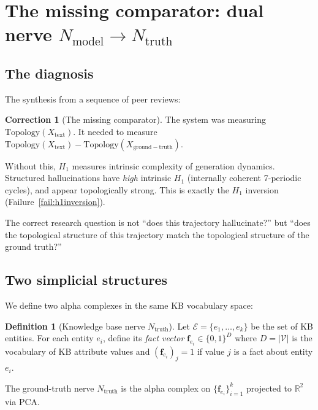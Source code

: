 \documentclass[11pt]{amsart}
\theoremstyle{definition}
\newtheorem{definition}[theorem]{Definition}
\newtheorem{correction}[theorem]{Correction}
\newcommand{\Nmod}{N_{\mathrm{model}}}
\newcommand{\Ntruth}{N_{\mathrm{truth}}}
\begin{document}
\section{The missing comparator: dual nerve $\Nmod \to \Ntruth$}
\label{sec:dual-nerve}

\subsection{The diagnosis}

The synthesis from a sequence of peer reviews:

\begin{correction}[The missing comparator]
The system was measuring $\mathrm{Topology}(X_\mathrm{text})$.
It needed to measure $\mathrm{Topology}(X_\mathrm{text}) - \mathrm{Topology}(X_\mathrm{ground-truth})$.

Without this, $H_1$ measures intrinsic complexity of generation dynamics.
Structured hallucinations have \emph{high} intrinsic $H_1$ (internally coherent
7-periodic cycles), and appear topologically strong.
This is exactly the $H_1$ inversion (Failure~\ref{fail:h1inversion}).

The correct research question is not ``does this trajectory hallucinate?''
but ``does the topological structure of this trajectory match the topological
structure of the ground truth?''
\end{correction}

\subsection{Two simplicial structures}

We define two alpha complexes in the same KB vocabulary space:

\begin{definition}[Knowledge base nerve $\Ntruth$]
Let $\mathcal{E} = \{e_1, \ldots, e_k\}$ be the set of KB entities.
For each entity $e_i$, define its \emph{fact vector} $\mathbf{f}_{e_i} \in \{0,1\}^D$
where $D = |\mathcal{V}|$ is the vocabulary of KB attribute values and
$(\mathbf{f}_{e_i})_j = 1$ if value $j$ is a fact about entity $e_i$.

The ground-truth nerve $\Ntruth$ is the alpha complex on
$\{\mathbf{f}_{e_i}\}_{i=1}^k$ projected to $\mathbb{R}^2$ via PCA.
\end{definition}
\end{document}

